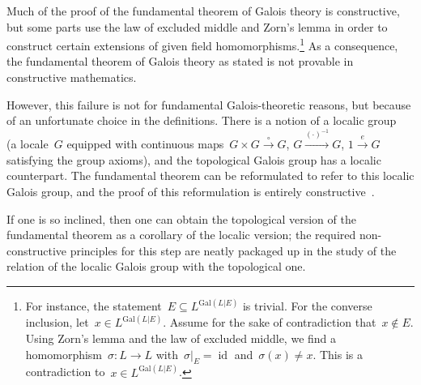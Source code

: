 \documentclass{ws-rv9x6}
\newcommand{\Gal}{\mathrm{Gal}}
\renewcommand{\_}{\mathpunct{.}}
\newcommand{\?}{\,{:}\,}
\begin{document}
Much of the proof of the fundamental theorem of Galois theory is constructive,
but some parts use the law of excluded middle and Zorn's lemma in order to
construct certain extensions of given field homomorphisms.\footnote{For
instance, the statement~$E \subseteq L^{\Gal(L|E)}$ is trivial. For the converse
inclusion, let~$x \in L^{\Gal(L|E)}$. Assume for the sake of contradiction
that~$x \not\in E$. Using Zorn's lemma and the law of excluded middle, we find
a homomorphism~$\sigma : L \to L$ with~$\sigma|_E = \operatorname{id}$
and~$\sigma(x) \neq x$. This is a contradiction to~$x \in L^{\Gal(L|E)}$.}
As a consequence, the fundamental theorem of Galois theory as stated is not
provable in constructive mathematics.

However, this failure is not for fundamental Galois-theoretic reasons, but because of an
unfortunate choice in the definitions. There is a notion of a localic group~\cite{wraith:localic-groups} (a
locale~$G$ equipped with continuous maps~$G \times G \xrightarrow{\circ} G$, $G
\xrightarrow{(\cdot)^{-1}} G$, $1 \xrightarrow{e} G$ satisfying the group
axioms), and the topological Galois group has a localic counterpart. The
fundamental theorem can be reformulated to refer to this localic Galois group,
and the proof of this reformulation is entirely constructive~\cite{wraith:galois-topos}.

If one is so inclined, then one can obtain the topological version of the
fundamental theorem as a corollary of the localic version; the required
non-constructive principles for this step are neatly packaged up in the study
of the relation of the localic Galois group with the topological one.
\end{document}
